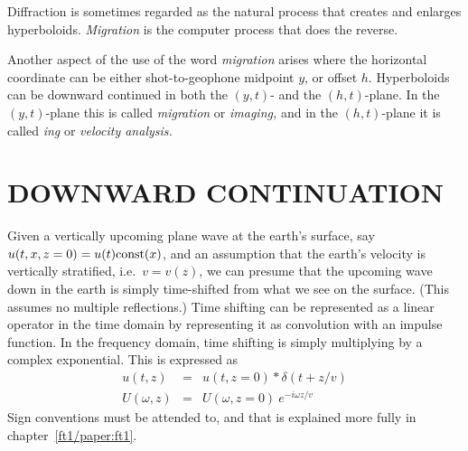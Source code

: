 \par\vspace{1.0\baselineskip}
Diffraction
is sometimes regarded as the natural process that creates
and enlarges hyperboloids.
{\em  Migration}
is the computer process that does the reverse.
\par
Another aspect of the use of the word
{\em  migration}
arises
where the horizontal coordinate can be either shot-to-geophone midpoint  $y$,
or offset  $h$.
Hyperboloids can be downward continued
in both the  $(y , t)$-  and the $(h , t)$-plane.
In the $(y , t)$-plane this is called
{\em  migration}
or 
{\em  imaging,}
and in the  $(h , t)$-plane it is called
{\em  {}ing}
or
{\em 
velocity analysis.
}

\section{DOWNWARD CONTINUATION}
Given a vertically upcoming plane wave
at the earth's surface,
say $u(t,x,z=0)=u(t) {\rm const}(x)$,
and an assumption that the earth's velocity is
vertically stratified, i.e.~$v=v(z)$,
we can presume that the upcoming wave down in the earth
is simply time-shifted from what we see on the surface.
(This assumes no multiple reflections.)
Time shifting can be represented as a linear operator in the time domain
by representing it as convolution with an impulse function.
In the frequency domain, time shifting is simply multiplying
by a complex exponential.
This is expressed as
\begin{eqnarray}
u( t    ,z) &=& u(     t,z=0) \ast \delta( t+z/v) \\
U(\omega,z) &=& U(\omega,z=0) \ e^{-i\omega z/v}
\end{eqnarray}
Sign conventions must be attended to,
and that is explained more fully in chapter~\ref{ft1/paper:ft1}.

